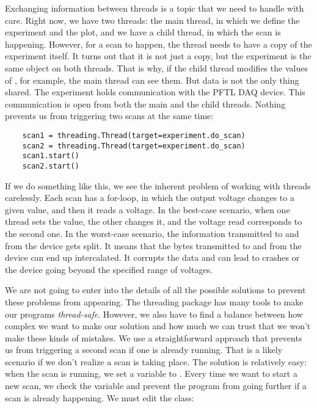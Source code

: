 Exchanging information between threads is a topic that we need to handle with care. Right now, we have two threads: the main thread, in which we define the experiment and the plot, and we have a child thread, in which the scan is happening. However, for a scan to happen, the thread needs to have a copy of the experiment itself. It turns out that it is not just a copy, but the experiment is the same object on both threads. That is why, if the child thread modifies the values of , for example, the main thread can see them. But data is not the only thing shared. The experiment holds communication with the {PFTL DAQ} device. This communication is open from both the main and the child threads. Nothing prevents us from triggering two scans at the same time:

\begin{verbatim}
    scan1 = threading.Thread(target=experiment.do_scan)
    scan2 = threading.Thread(target=experiment.do_scan)
    scan1.start()
    scan2.start()
\end{verbatim}

If we do something like this, we see the inherent problem of working with threads carelessly. Each scan has a for-loop, in which the output voltage changes to a given value, and then it reads a voltage. In the best-case scenario, when one thread sets the value, the other changes it, and the voltage read corresponds to the second one. In the worst-case scenario, the information transmitted to and from the device gets split. It means that the bytes transmitted to and from the device can end up intercalated. It corrupts the data and can lead to crashes or the device going beyond the specified range of voltages.

We are not going to enter into the details of all the possible solutions to prevent these problems from appearing. The threading package has many tools to make our programs \emph{thread-safe}. However, we also have to find a balance between how complex we want to make our solution and how much we can trust that we won't make these kinds of mistakes. We use a straightforward approach that prevents us from triggering a second scan if one is already running. That is a likely scenario if we don't realize a scan is taking place. The solution is relatively easy: when the scan is running, we set a variable to . Every time we want to start a new scan, we check the variable and prevent the program from going further if a scan is already happening. We must edit the  class:

